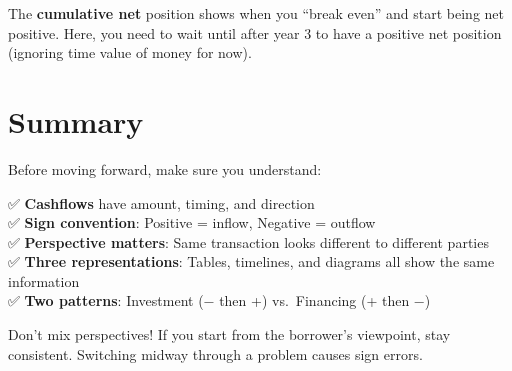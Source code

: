 \documentclass[
  letterpaper,
]{scrbook}
\begin{document}
\FloatBarrier

\begin{tcolorbox}[enhanced jigsaw, toptitle=1mm, colbacktitle=quarto-callout-tip-color!10!white, opacityback=0, leftrule=.75mm, breakable, colframe=quarto-callout-tip-color-frame, toprule=.15mm, opacitybacktitle=0.6, coltitle=black, bottomrule=.15mm, colback=white, arc=.35mm, titlerule=0mm, rightrule=.15mm, left=2mm, title=\textcolor{quarto-callout-tip-color}{\faLightbulb}\hspace{0.5em}{Intuition: The Cumulative View}, bottomtitle=1mm]

The \textbf{cumulative net} position shows when you ``break even'' and
start being net positive. Here, you need to wait until after year 3 to
have a positive net position (ignoring time value of money for now).

\end{tcolorbox}

\section{Summary}\label{summary}

Before moving forward, make sure you understand:

✅ \textbf{Cashflows} have amount, timing, and direction\\
✅ \textbf{Sign convention}: Positive = inflow, Negative = outflow\\
✅ \textbf{Perspective matters}: Same transaction looks different to
different parties\\
✅ \textbf{Three representations}: Tables, timelines, and diagrams all
show the same information\\
✅ \textbf{Two patterns}: Investment (− then +) vs.~Financing (+ then −)

\begin{tcolorbox}[enhanced jigsaw, toptitle=1mm, colbacktitle=quarto-callout-warning-color!10!white, opacityback=0, leftrule=.75mm, breakable, colframe=quarto-callout-warning-color-frame, toprule=.15mm, opacitybacktitle=0.6, coltitle=black, bottomrule=.15mm, colback=white, arc=.35mm, titlerule=0mm, rightrule=.15mm, left=2mm, title=\textcolor{quarto-callout-warning-color}{\faExclamationTriangle}\hspace{0.5em}{Common Pitfall}, bottomtitle=1mm]

Don't mix perspectives! If you start from the borrower's viewpoint, stay
consistent. Switching midway through a problem causes sign errors.

\end{tcolorbox}
\end{document}
